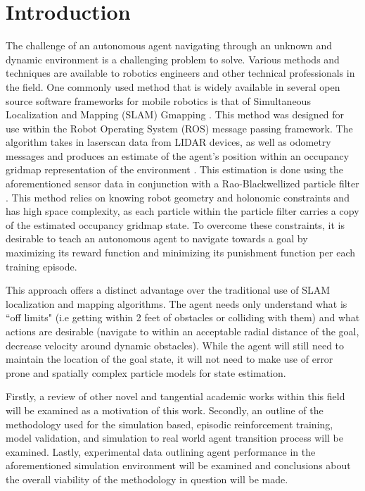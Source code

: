 \documentclass[conference]{IEEEtran}
\begin{document}
\section{Introduction}
The challenge of an autonomous agent navigating through an unknown and dynamic environment is a challenging problem to solve. Various methods and techniques are available to robotics engineers and other technical professionals in the field. One commonly used method that is widely available in several open source software frameworks for mobile robotics is that of Simultaneous Localization and Mapping (SLAM) Gmapping \cite{b1}. This method was designed for use within the Robot Operating System (ROS) message passing framework. The algorithm takes in laserscan data from LIDAR devices, as well as odometry messages and produces an estimate of the agent's position within an occupancy gridmap representation of the environment \cite{b1}. This estimation is done using the aforementioned sensor data in conjunction with a Rao-Blackwellized particle filter \cite{b1}. This method relies on knowing robot geometry and holonomic constraints and has high space complexity, as each particle within the particle filter carries a copy of the estimated occupancy gridmap state. To overcome these constraints, it is desirable to teach an autonomous agent to navigate towards a goal by maximizing its reward function and minimizing its punishment function per each training episode.

This approach offers a distinct advantage over the traditional use of SLAM localization and mapping algorithms. The agent needs only understand what is ``off limits" (i.e getting within 2 feet of obstacles or colliding with them) and what actions are desirable (navigate to within an acceptable radial distance of the goal, decrease velocity around dynamic obstacles). While the agent will still need to maintain the location of the goal state, it will not need to make use of error prone and spatially complex particle models for state estimation. 

Firstly, a review of other novel and tangential academic works within this field will be examined as a motivation of this work. Secondly, an outline of the methodology used for the simulation based, episodic reinforcement training, model validation, and simulation to real world agent transition process will be examined. Lastly, experimental data outlining agent performance in the aforementioned simulation environment will be examined and conclusions about the overall viability of the methodology in question will be made. 
\end{document}
